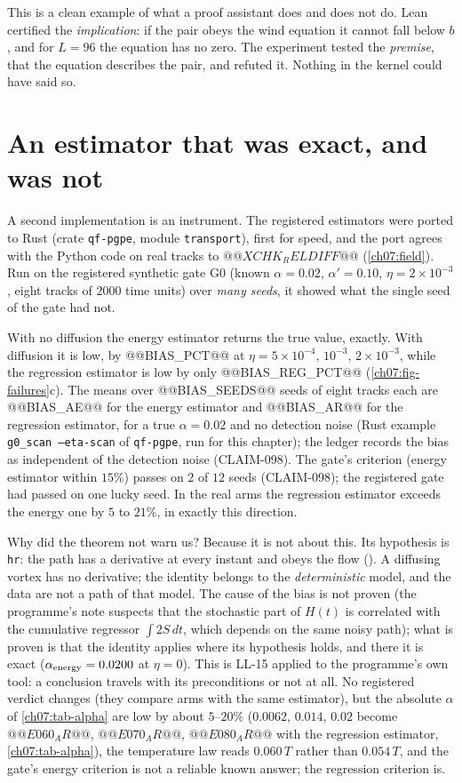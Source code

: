 This is a clean example of what a proof assistant does and does not do. Lean certified the \emph{implication}: if the pair obeys the wind equation it cannot fall below $b$, and for $L=96$ the equation has no zero. The experiment tested the \emph{premise}, that the equation describes the pair, and refuted it. Nothing in the kernel could have said so.

\section{An estimator that was exact, and was not}\label{ch07:bias}

A second implementation is an instrument. The registered estimators were ported to Rust (crate \texttt{qf-pgpe}, module \texttt{transport}), first for speed, and the port agrees with the Python code on real tracks to $@@XCHK_RELDIFF@@$ (\cref{ch07:field}). Run on the registered synthetic gate G0 (known $\alpha=0.02$, $\alpha'=0.10$, $\eta=2\times10^{-3}$, eight tracks of $2000$ time units) over \emph{many seeds}, it showed what the single seed of
the gate had not.

With no diffusion the energy estimator returns the true value, exactly. With diffusion it is low, by @@BIAS_PCT@@ at $\eta=5\times10^{-4}$, $10^{-3}$, $2\times10^{-3}$, while the regression estimator is low by only @@BIAS_REG_PCT@@ (\cref{ch07:fig-failures}c). The means over @@BIAS_SEEDS@@ seeds of eight tracks each are @@BIAS_AE@@ for the energy estimator and @@BIAS_AR@@ for the regression estimator, for a true $\alpha=0.02$ and no detection noise (Rust example \texttt{g0\_scan --eta-scan} of \texttt{qf-pgpe}, run for this chapter); the ledger records the bias as independent of the detection noise (CLAIM-098). The gate's criterion (energy estimator within $15\%$) passes on $2$ of $12$ seeds (CLAIM-098); the registered gate had
passed on one lucky seed. In the real arms the regression estimator exceeds the energy one by $5$ to $21\%$, in exactly this direction.

Why did the theorem not warn us? Because it is not about this. Its hypothesis is \texttt{hr}: the path has a derivative at every instant and obeys the flow (). A diffusing vortex has no derivative; the identity belongs to the \emph{deterministic} model, and the data are not a path of that model. The cause of the bias is not proven (the programme's note suspects that the stochastic part of $H(t)$ is
correlated with the cumulative regressor $\int2S\,dt$, which depends on the same noisy path); what is proven is that the identity applies where its hypothesis holds, and there it is exact ($\alpha_{\rm energy}=0.0200$ at $\eta=0$). This is LL-15 applied to the programme's own tool: a conclusion travels with its preconditions or not at all. No registered verdict changes (they compare arms with the same estimator), but the absolute $\alpha$ of \cref{ch07:tab-alpha}
are low by about $5$--$20\%$ ($0.0062$, $0.014$, $0.02$ become $@@E060_AR@@$, $@@E070_AR@@$, $@@E080_AR@@$ with the regression estimator, \cref{ch07:tab-alpha}), the temperature law reads $0.060\,T$ rather than $0.054\,T$, and the gate's energy criterion is not a reliable known answer; the regression criterion is.


